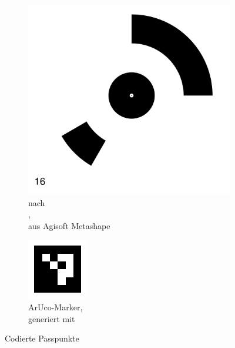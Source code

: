\documentclass[./00PhotoBox.tex]{subfiles}
\begin{document}
\begin{figure}
    \centering
    \begin{subfigure}{0.45\textwidth}
        \includegraphics[width=0.98\linewidth]{img/schneider.png}
        \centering
        \caption{ nach \\ \cite{schneider},\\aus Agisoft Metashape} %
        \label{img:schneider} %
    \end{subfigure}
    \begin{subfigure}{0.45\textwidth}
        \includegraphics[width=0.98\linewidth]{img/aruco.png}
        \centering
        \caption{ArUco-Marker,\\generiert mit \cite{opencv}\\} %
        \label{img:aruco} %
    \end{subfigure}
    \caption{Codierte Passpunkte} %
\end{figure}
\end{document}
